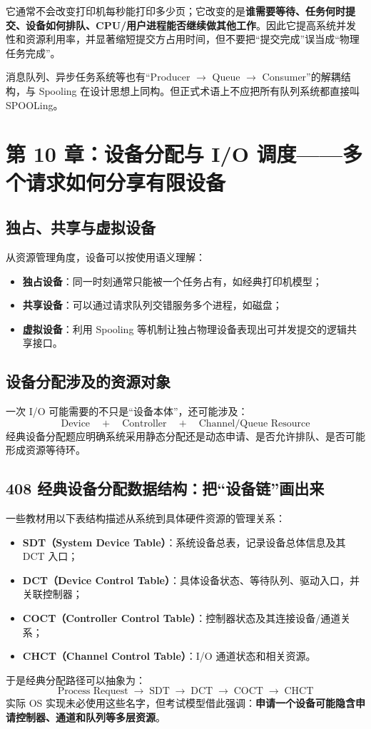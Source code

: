 \documentclass[11pt,a4paper]{ctexart}
\newcommand{\kw}[1]{\textbf{#1}}
\newcommand{\arr}{\;\longrightarrow\;}
\begin{document}
\begin{warn}
它通常不会改变打印机每秒能打印多少页；它改变的是\kw{谁需要等待、任务何时提交、设备如何排队、CPU/用户进程能否继续做其他工作}。因此它提高系统并发性和资源利用率，并显著缩短提交方占用时间，但不要把“提交完成”误当成“物理任务完成”。
\end{warn}

\begin{eng}
消息队列、异步任务系统等也有“Producer $\to$ Queue $\to$ Consumer”的解耦结构，与 Spooling 在设计思想上同构。但正式术语上不应把所有队列系统都直接叫 SPOOLing。
\end{eng}

\section{第 10 章：设备分配与 I/O 调度——多个请求如何分享有限设备}

\subsection{独占、共享与虚拟设备}
从资源管理角度，设备可以按使用语义理解：
\begin{itemize}
  \item \kw{独占设备}：同一时刻通常只能被一个任务占有，如经典打印机模型；
  \item \kw{共享设备}：可以通过请求队列交错服务多个进程，如磁盘；
  \item \kw{虚拟设备}：利用 Spooling 等机制让独占物理设备表现出可并发提交的逻辑共享接口。
\end{itemize}

\subsection{设备分配涉及的资源对象}
一次 I/O 可能需要的不只是“设备本体”，还可能涉及：
\[
\text{Device}\quad+\quad\text{Controller}\quad+\quad\text{Channel/Queue Resource}
\]
经典设备分配题应明确系统采用静态分配还是动态申请、是否允许排队、是否可能形成资源等待环。

\subsection{408 经典设备分配数据结构：把“设备链”画出来}
一些教材用以下表结构描述从系统到具体硬件资源的管理关系：
\begin{itemize}
  \item \kw{SDT（System Device Table）}：系统设备总表，记录设备总体信息及其 DCT 入口；
  \item \kw{DCT（Device Control Table）}：具体设备状态、等待队列、驱动入口，并关联控制器；
  \item \kw{COCT（Controller Control Table）}：控制器状态及其连接设备/通道关系；
  \item \kw{CHCT（Channel Control Table）}：I/O 通道状态和相关资源。
\end{itemize}
于是经典分配路径可以抽象为：
\[
\boxed{\text{Process Request}\arr\text{SDT}\arr\text{DCT}\arr\text{COCT}\arr\text{CHCT}}
\]
实际 OS 实现未必使用这些名字，但考试模型借此强调：\kw{申请一个设备可能隐含申请控制器、通道和队列等多层资源}。
\end{document}
